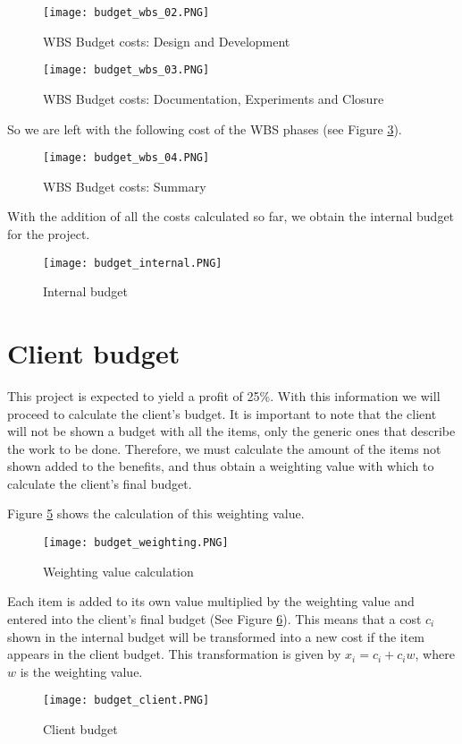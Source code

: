 \begin{figure}[H]
    \caption{WBS Budget costs: Design and Development}
    \label{fig-budget-wbs-02}
  \centering
  \texttt{[image: budget\_wbs\_02.PNG]}
\end{figure}


\begin{figure}[H]
    \caption{WBS Budget costs: Documentation, Experiments and Closure}
    \label{fig-budget-wbs-03}
  \centering
  \texttt{[image: budget\_wbs\_03.PNG]}
\end{figure}

So we are left with the following cost of the WBS phases (see Figure \ref{fig-budget-wbs-sum}).


\begin{figure}[H]
    \caption{WBS Budget costs: Summary}
    \label{fig-budget-wbs-sum}
  \centering
  \texttt{[image: budget\_wbs\_04.PNG]}
\end{figure}

With the addition of all the costs calculated so far, we obtain the internal budget for the project.


\begin{figure}[H]
    \caption{Internal budget}
    \label{fig-budget-internal}
  \centering
  \texttt{[image: budget\_internal.PNG]}
\end{figure}



\section{Client budget}


This project is expected to yield a profit of 25\%. With this information we will proceed to calculate the client's budget. It is important to note that the client will not be shown a budget with all the items, only the generic ones that describe the work to be done. Therefore, we must calculate the amount of the items not shown added to the benefits, and thus obtain a weighting value with which to calculate the client's final budget.

Figure \ref{fig-budget-weight} shows the calculation of this weighting value.


\begin{figure}[H]
    \caption{Weighting value calculation}
    \label{fig-budget-weight}
  \centering
  \texttt{[image: budget\_weighting.PNG]}
\end{figure}

Each item is added to its own value multiplied by the weighting value and entered into the client's final budget (See Figure \ref{fig-budget-client}). This means that a cost $c_{i}$ shown in the internal budget will be transformed into a new cost if the item appears in the client budget. This transformation is given by $x_{i} = c_{i} + c_{i} w$, where $w$ is the weighting value. 


\begin{figure}[H]
    \caption{Client budget}
    \label{fig-budget-client}
  \centering
  \texttt{[image: budget\_client.PNG]}
\end{figure}




